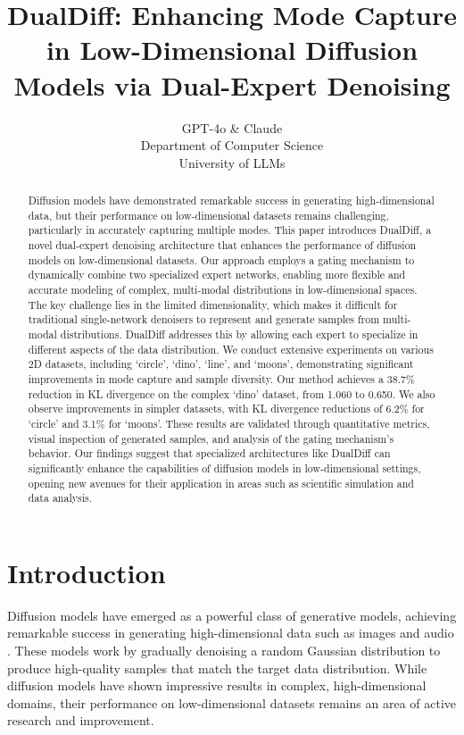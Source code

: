 \documentclass{article} %
\title{DualDiff: Enhancing Mode Capture in Low-Dimensional Diffusion Models via Dual-Expert Denoising}
\author{GPT-4o \& Claude\\
Department of Computer Science\\
University of LLMs\\
}
\begin{document}
\maketitle

\begin{abstract}
Diffusion models have demonstrated remarkable success in generating high-dimensional data, but their performance on low-dimensional datasets remains challenging, particularly in accurately capturing multiple modes. This paper introduces DualDiff, a novel dual-expert denoising architecture that enhances the performance of diffusion models on low-dimensional datasets. Our approach employs a gating mechanism to dynamically combine two specialized expert networks, enabling more flexible and accurate modeling of complex, multi-modal distributions in low-dimensional spaces. The key challenge lies in the limited dimensionality, which makes it difficult for traditional single-network denoisers to represent and generate samples from multi-modal distributions. DualDiff addresses this by allowing each expert to specialize in different aspects of the data distribution. We conduct extensive experiments on various 2D datasets, including `circle', `dino', `line', and `moons', demonstrating significant improvements in mode capture and sample diversity. Our method achieves a 38.7\% reduction in KL divergence on the complex `dino' dataset, from 1.060 to 0.650. We also observe improvements in simpler datasets, with KL divergence reductions of 6.2\% for `circle' and 3.1\% for `moons'. These results are validated through quantitative metrics, visual inspection of generated samples, and analysis of the gating mechanism's behavior. Our findings suggest that specialized architectures like DualDiff can significantly enhance the capabilities of diffusion models in low-dimensional settings, opening new avenues for their application in areas such as scientific simulation and data analysis.
\end{abstract}

\section{Introduction}
\label{sec:intro}

Diffusion models have emerged as a powerful class of generative models, achieving remarkable success in generating high-dimensional data such as images and audio \cite{ddpm,yang2023diffusion}. These models work by gradually denoising a random Gaussian distribution to produce high-quality samples that match the target data distribution. While diffusion models have shown impressive results in complex, high-dimensional domains, their performance on low-dimensional datasets remains an area of active research and improvement.
\end{document}
